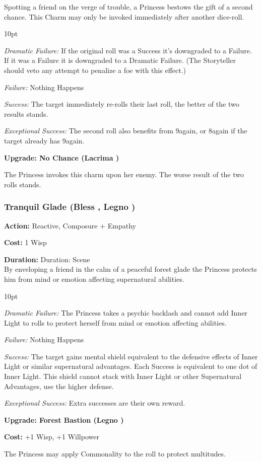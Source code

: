 Spotting a friend on the verge of trouble, a Princess bestows the gift of a second chance. This Charm may only be invoked immediately after another dice-roll. 

\begin{myindentpar}{10pt}

\emph{Dramatic Failure:} If the original roll was a Success it's downgraded to a Failure. If it was a Failure it is downgraded to a Dramatic Failure. (The Storyteller should veto any attempt to penalize a foe with this effect.)

\emph{Failure:} Nothing Happens 

\emph{Success:} The target immediately re-rolls their last roll, the better of the two results stands. 

\emph{Exceptional Success:} The second roll also benefits from 9again, or 8again if the target already has 9again.

\textbf{Upgrade: No Chance (Lacrima \textbullet\textbullet)}

The Princess invokes this charm upon her enemy. The worse result of the two rolls stands. 

\end{myindentpar}

\subsubsection*{Tranquil Glade (Bless \textbullet\textbullet, Legno \textbullet\textbullet\textbullet)}

\noindent \textbf{Action:} Reactive, Composure + Empathy

\noindent \textbf{Cost:} 1 Wisp

\noindent \textbf{Duration:} Duration: Scene \\

By enveloping a friend in the calm of a peaceful forest glade the Princess protects him from mind or emotion affecting supernatural abilities. 

\begin{myindentpar}{10pt}

\emph{Dramatic Failure:} The Princess takes a psychic backlash and cannot add Inner Light to rolls to protect herself from mind or emotion affecting abilities. 

\emph{Failure:} Nothing Happens 

\emph{Success:} The target gains mental shield equivalent to the defensive effects of Inner Light or similar supernatural advantages. Each Success is equivalent to one dot of Inner Light. This shield cannot stack with Inner Light or other Supernatural Advantages, use the higher defense.

\emph{Exceptional Success:} Extra successes are their own reward. 

\textbf{Upgrade: Forest Bastion (Legno \textbullet\textbullet\textbullet\textbullet)}

\textbf{Cost:} +1 Wisp, +1 Willpower

The Princess may apply Commonality to the roll to protect multitudes.

\end{myindentpar}

